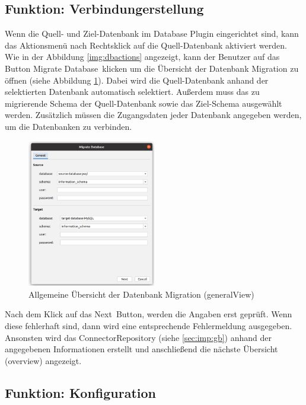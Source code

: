 \subsection{Funktion: Verbindungerstellung}
		
	Wenn die Quell- und Ziel-Datenbank im Database Plugin eingerichtet sind, kann das Aktionsmenü nach Rechtsklick auf die Quell-Datenbank aktiviert werden. Wie in der Abbildung \ref{img:dbactions} angezeigt, kann der Benutzer auf das Button \glqq Migrate Database\grqq \, klicken um die Übersicht der Datenbank Migration zu öffnen (siehe Abbildung \ref{img:ui:generalView}). Dabei wird die Quell-Datenbank anhand der selektierten Datenbank automatisch selektiert. Außerdem muss das zu migrierende Schema der Quell-Datenbank sowie das Ziel-Schema ausgewählt werden. Zusätzlich müssen die Zugangsdaten jeder Datenbank angegeben werden, um die Datenbanken zu verbinden.
	\begin{figure}[h]
		\centering
		\includegraphics[width=0.5\textwidth]{images/ui/generalView}
		\caption{Allgemeine Übersicht der Datenbank Migration (generalView)}
		\label{img:ui:generalView}
	\end{figure}
	Nach dem Klick auf das \glqq Next\grqq \, Button, werden die Angaben erst geprüft. Wenn diese fehlerhaft sind, dann wird eine entsprechende Fehlermeldung ausgegeben. Ansonsten wird das ConnectorRepository (siehe \ref{sec:imp:gb}) anhand der angegebenen Informationen erstellt und anschließend die nächste Übersicht (overview) angezeigt.
	
\subsection{Funktion: Konfiguration}
	
